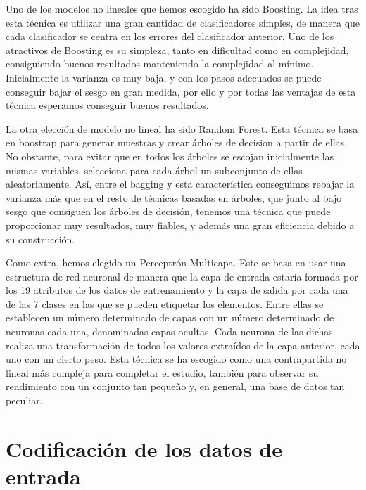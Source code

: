 \documentclass{article}
\begin{document}
	Uno de los modelos no lineales que hemos escogido ha sido Boosting. La idea tras esta técnica es utilizar una gran cantidad de clasificadores simples, de manera que cada clasificador se centra en los errores del clasificador anterior. Uno de los atractivos de Boosting es su simpleza, tanto en dificultad como en complejidad, consiguiendo buenos resultados manteniendo la complejidad al mínimo. Inicialmente la varianza es muy baja, y con los pasos adecuados se puede conseguir bajar el sesgo en gran medida, por ello y por todas las ventajas de esta técnica esperamos conseguir buenos resultados.
	
	La otra elección de modelo no lineal ha sido Random Forest. Esta técnica se basa en boostrap para generar muestras y crear árboles de decision a partir de ellas. No obstante, para evitar que en todos los árboles se escojan inicialmente las mismas variables, selecciona para cada árbol un subconjunto de ellas aleatoriamente. Así, entre el bagging y esta característica conseguimos rebajar la varianza más que en el resto de técnicas basadas en árboles, que junto al bajo sesgo que consiguen los árboles de decisión, tenemos una técnica que puede proporcionar muy resultados, muy fiables, y además una gran eficiencia debido a su construcción.
	
	Como extra, hemos elegido un Perceptrón Multicapa. Este se basa en usar una estructura de red neuronal de manera que la capa de entrada estaría formada por los 19 atributos de los datos de entrenamiento y la capa de salida por cada una de las 7 clases en las que se pueden etiquetar los elementos. Entre ellas se establecen un número determinado de capas con un número determinado de neuronas cada una, denominadas capas ocultas. Cada neurona de las dichas realiza una transformación de todos los valores extraídos de la capa anterior, cada uno con un cierto peso. Esta técnica se ha escogido como una contrapartida no lineal más compleja para completar el estudio, también para observar su rendimiento con un conjunto tan pequeño y, en general, una base de datos tan peculiar.
	
	\section{Codificación de los datos de entrada}
	
\end{document}
